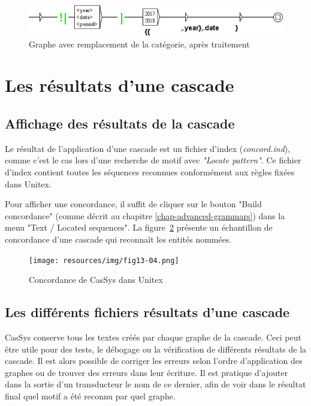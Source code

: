 \begin{figure}[!htb]
  \centering
  \includegraphics[width=14cm]{resources/img/graphe_remplacement_genere.png}
  \caption{Graphe avec remplacement de la catégorie, après traitement}
  \label{fig:graphe_remplacement_genere}
\end{figure}

\section{Les résultats d'une cascade}

\subsection{Affichage des résultats de la cascade}
\label{subsec:resultsCascade}

Le résultat de l'application d'une cascade est un fichier d'index (\textit{concord.ind}), comme c'est le cas
lors d'une recherche de motif avec \textit{"Locate pattern"}. Ce fichier d'index contient toutes les séquences
reconnues conformément aux règles fixées dans Unitex.

\bigskip
\noindent Pour afficher une concordance, il suffit de cliquer sur le bouton "Build concordance"
(comme décrit au chapitre \ref{chap-advanced-grammars}) dans la menu "Text / Located sequences".
La figure~\ref{fig13-04} présente un échantillon de concordance d'une cascade qui reconnaît les entités
nommées.


\begin{figure}[!htb]
  \centering
  \texttt{[image: resources/img/fig13-04.png]}
  \caption{Concordance de CasSys dans Unitex}
  \label{fig13-04}
\end{figure}

\subsection{Les différents fichiers résultats d'une cascade}

CasSys conserve tous les textes créés par chaque graphe  de la cascade. Ceci peut être
utile  pour des tests, le débogage ou la vérification de différents résultats de la cascade. Il est
alors possible de corriger les erreurs selon l'ordre d'application des graphes ou de trouver des
erreurs dans leur écriture. Il est pratique d'ajouter dans la sortie d'un transducteur le nom de ce
dernier, afin de voir dans le résultat final quel motif a été reconnu par quel graphe.

